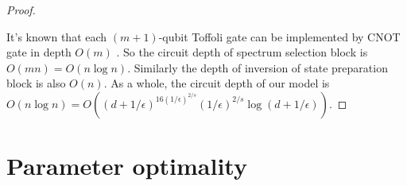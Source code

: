 \documentclass{article}
\theoremstyle{plain}
\theoremstyle{definition}
\theoremstyle{remark}
\begin{document}
\begin{proof}
\begin{center}
{
    }
    \end{center}
    It's known that each $(m+1)$-qubit Toffoli gate can be implemented by CNOT gate in depth $O(m)$ \cite{Saeedi2013}. So the circuit depth of spectrum selection block is $O(mn)=O(n\log n)$. Similarly the depth of inversion of state preparation block is also $O(n)$. As a whole, the circuit depth of our model is $O(n\log n) = O((d+1/\epsilon)^{16(1/\epsilon)^{2/s}}(1/\epsilon)^{2/s}\log(d+1/\epsilon))$.

    
\end{proof}










\section{Parameter optimality}\label{apd5}


\end{document}
